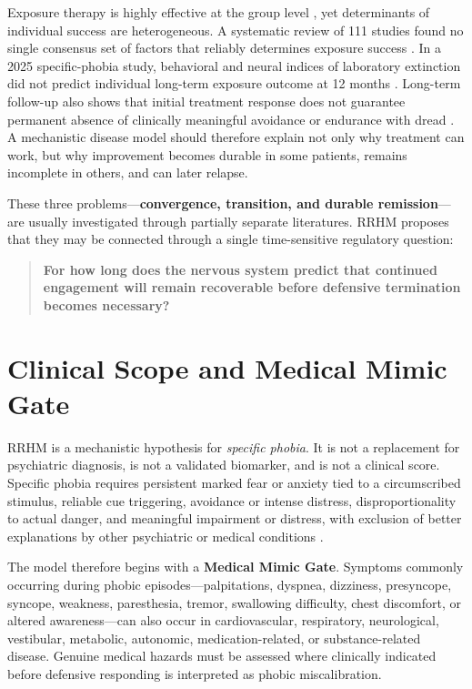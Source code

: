 \documentclass[11pt]{article}
\begin{document}
Exposure therapy is highly effective at the group level \cite{odgers2022}, yet determinants of individual success are heterogeneous. A systematic review of 111 studies found no single consensus set of factors that reliably determines exposure success \cite{bohnlein2020}. In a 2025 specific-phobia study, behavioral and neural indices of laboratory extinction did not predict individual long-term exposure outcome at 12 months \cite{devos2025}. Long-term follow-up also shows that initial treatment response does not guarantee permanent absence of clinically meaningful avoidance or endurance with dread \cite{lipsitz1999}. A mechanistic disease model should therefore explain not only why treatment can work, but why improvement becomes durable in some patients, remains incomplete in others, and can later relapse.

These three problems---\textbf{convergence, transition, and durable remission}---are usually investigated through partially separate literatures. RRHM proposes that they may be connected through a single time-sensitive regulatory question:

\begin{quote}
\textbf{For how long does the nervous system predict that continued engagement will remain recoverable before defensive termination becomes necessary?}
\end{quote}

\section{Clinical Scope and Medical Mimic Gate}

RRHM is a mechanistic hypothesis for \emph{specific phobia}. It is not a replacement for psychiatric diagnosis, is not a validated biomarker, and is not a clinical score. Specific phobia requires persistent marked fear or anxiety tied to a circumscribed stimulus, reliable cue triggering, avoidance or intense distress, disproportionality to actual danger, and meaningful impairment or distress, with exclusion of better explanations by other psychiatric or medical conditions \cite{who2024}.

The model therefore begins with a \textbf{Medical Mimic Gate}. Symptoms commonly occurring during phobic episodes---palpitations, dyspnea, dizziness, presyncope, syncope, weakness, paresthesia, tremor, swallowing difficulty, chest discomfort, or altered awareness---can also occur in cardiovascular, respiratory, neurological, vestibular, metabolic, autonomic, medication-related, or substance-related disease. Genuine medical hazards must be assessed where clinically indicated before defensive responding is interpreted as phobic miscalibration.
\end{document}
